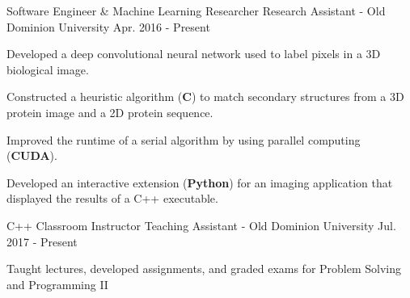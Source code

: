 \begin{cventries}
  \cventry
    {Software Engineer \& Machine Learning Researcher}
    {Research Assistant - Old Dominion University}
    {Apr. 2016 - Present}
    {}
    {
      \begin{cvitems}
        \item {Developed a deep convolutional neural network used to label pixels in a 3D biological
image.}
        \item {Constructed a heuristic algorithm (\textbf{C}) to match secondary structures from a 3D protein
image and a 2D protein sequence.}
        \item {Improved the runtime of a serial algorithm by using parallel computing (\textbf{CUDA}).}
        \item {Developed an interactive extension (\textbf{Python}) for an imaging application that displayed the results of a C++ executable.}
      \end{cvitems}
    }
  \cventry
    {C++ Classroom Instructor}
    {Teaching Assistant - Old Dominion University}
    {Jul. 2017 - Present}
    {}
    {
      \begin{cvitems}
        \item {Taught lectures, developed assignments, and graded exams for Problem Solving and Programming II}
      \end{cvitems}
    }
\end{cventries}
